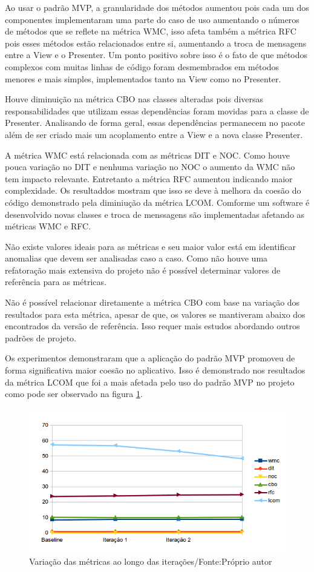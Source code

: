 Ao usar o padrão MVP, a granularidade dos métodos aumentou pois cada um dos
componentes implementaram uma parte do caso de uso aumentando o números de
métodos que se reflete na métrica WMC, isso afeta também a métrica RFC pois
esses métodos estão relacionados entre si, aumentando a troca de mensagens entre
a View e o Presenter. Um ponto positivo sobre isso é o fato de que métodos 
complexos com muitas linhas de código foram desmembrados em métodos menores e
mais simples, implementados tanto na View como no Presenter.

Houve diminuição na métrica CBO nas classes alteradas pois diversas
responsabilidades que utilizam essas dependências foram movidas para a classe de
Presenter. Analisando de forma geral, essas dependências permanecem no pacote
além de ser criado mais um acoplamento entre a View e a nova classe Presenter.

A métrica WMC está relacionada com as métricas DIT e NOC. Como houve pouca
variação no DIT e nenhuma variação no NOC o aumento da WMC não tem impacto
relevante. Entretanto a métrica RFC aumentou indicando maior complexidade. Os
resultaddos mostram que isso se deve à melhora da coesão do código demonstrado pela
diminiução da métrica LCOM. Comforme um software é desenvolvido novas classes e
troca de menssagens são implementadas afetando as métricas WMC e RFC. 

Não existe valores ideais para as métricas e seu maior valor está em identificar
anomalias que devem ser analisadas caso a caso. Como não houve uma refatoração
mais extensiva do projeto não é possível determinar valores de referência para
as métricas. 

Não é possível relacionar diretamente a métrica CBO com base na
variação dos resultados para esta métrica, apesar de que, os valores se
mantiveram abaixo dos encontrados da versão de referência.
Isso requer mais estudos abordando outros padrões de projeto. 

Os experimentos demonstraram que a aplicação do padrão MVP promoveu de forma
significativa maior coesão no aplicativo. Isso é demonstrado nos resultados da
métrica LCOM que foi a mais afetada pelo uso do padrão MVP no projeto como pode
ser observado na figura \ref{fig:allmetrics}.

\begin{figure}[!h]
	\centering
	\includegraphics{img/allmetrics}
	\caption[Variação das métricas ao longo das iterações]{Variação das métricas ao
	longo das iterações/Fonte:Próprio autor}
	\label{fig:allmetrics}
\end{figure}

